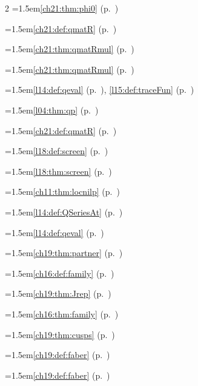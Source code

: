 \begin{multicols}{2}
\hangindent=1.5em\quad \ref{ch21:thm:phi0} (p.~\pageref{ch21:thm:phi0})\par
\hangindent=1.5em\quad \ref{ch21:def:qmatR} (p.~\pageref{ch21:def:qmatR})\par
\hangindent=1.5em\quad \ref{ch21:thm:qmatRmul} (p.~\pageref{ch21:thm:qmatRmul})\par
\hangindent=1.5em\quad \ref{ch21:thm:qmatRmul} (p.~\pageref{ch21:thm:qmatRmul})\par
\hangindent=1.5em\quad \ref{l14:def:qeval} (p.~\pageref{l14:def:qeval}), \ref{l15:def:traceFun} (p.~\pageref{l15:def:traceFun})\par
\hangindent=1.5em\quad \ref{l04:thm:qp} (p.~\pageref{l04:thm:qp})\par
\hangindent=1.5em\quad \ref{ch21:def:qmatR} (p.~\pageref{ch21:def:qmatR})\par
\hangindent=1.5em\quad \ref{l18:def:screen} (p.~\pageref{l18:def:screen})\par
\hangindent=1.5em\quad \ref{l18:thm:screen} (p.~\pageref{l18:thm:screen})\par
\hangindent=1.5em\quad \ref{ch11:thm:locnilp} (p.~\pageref{ch11:thm:locnilp})\par
\hangindent=1.5em\quad \ref{l14:def:QSeriesAt} (p.~\pageref{l14:def:QSeriesAt})\par
\hangindent=1.5em\quad \ref{l14:def:qeval} (p.~\pageref{l14:def:qeval})\par
\hangindent=1.5em\quad \ref{ch19:thm:partner} (p.~\pageref{ch19:thm:partner})\par
\hangindent=1.5em\quad \ref{ch16:def:family} (p.~\pageref{ch16:def:family})\par
\hangindent=1.5em\quad \ref{ch19:thm:Jrep} (p.~\pageref{ch19:thm:Jrep})\par
\hangindent=1.5em\quad \ref{ch16:thm:family} (p.~\pageref{ch16:thm:family})\par
\hangindent=1.5em\quad \ref{ch19:thm:cusps} (p.~\pageref{ch19:thm:cusps})\par
\hangindent=1.5em\quad \ref{ch19:def:faber} (p.~\pageref{ch19:def:faber})\par
\hangindent=1.5em\quad \ref{ch19:def:faber} (p.~\pageref{ch19:def:faber})\par

\end{multicols}
